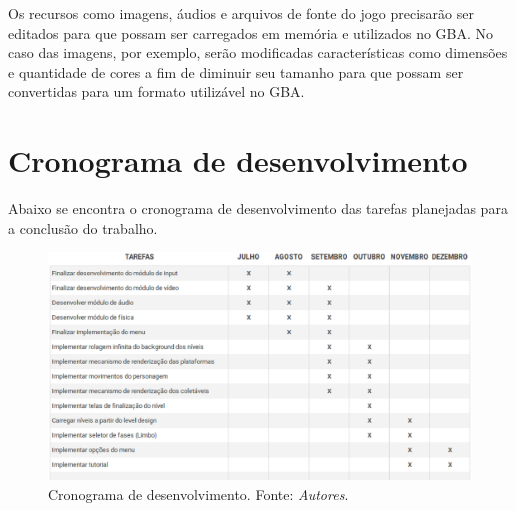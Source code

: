       Os recursos como imagens, áudios e arquivos de fonte do jogo precisarão ser editados para que possam ser carregados em memória e utilizados no GBA. No caso das imagens, por exemplo, serão modificadas características como dimensões e quantidade de cores a fim de diminuir seu tamanho para que possam ser convertidas para um formato utilizável no GBA.

\section{Cronograma de desenvolvimento}

  Abaixo se encontra o cronograma de desenvolvimento das tarefas planejadas para a conclusão do trabalho.

  \begin{figure}[H]
    \centering \includegraphics[keepaspectratio=true,scale=0.8]{figuras/cronograma.eps}
    \caption[Cronograma de desenvolvimento]
      {Cronograma de desenvolvimento. Fonte: \textit{Autores}.}
    \label{cronograma}
  \end{figure}